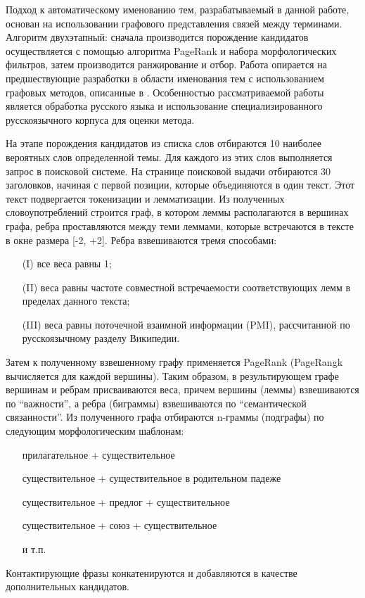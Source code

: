 Подход к автоматическому именованию тем, разрабатываемый в данной работе, основан на использовании графового представления связей между терминами. Алгоритм двухэтапный: сначала производится порождение кандидатов осуществляется с помощью алгоритма PageRank и набора морфологических фильтров, затем производится ранжирование и отбор. Работа опирается на предшествующие разработки в области именования тем с использованием графовых методов, описанные в \parencite{aletras2014labelling}. Особенностью рассматриваемой работы является обработка русского языка и использование специализированного русскоязычного корпуса для оценки метода.

На этапе порождения кандидатов из списка слов отбираются 10 наиболее вероятных слов определенной темы. Для каждого из этих слов выполняется запрос в поисковой системе. На странице поисковой выдачи отбираются 30 заголовков, начиная с первой позиции, которые объединяются в один текст. Этот текст подвергается токенизации и лемматизации. Из полученных словоупотреблений строится граф, в котором леммы располагаются в вершинах графа, ребра проставляются между теми леммами, которые встречаются в тексте в окне размера [-2, +2]. Ребра взвешиваются тремя способами: 
\begin{itemize}
    \item[(I)] все веса равны 1; 
    \item[(II)] веса равны частоте совместной встречаемости соответствующих лемм в пределах данного текста;
    \item[(III)] веса равны поточечной взаимной информации (PMI), рассчитанной по русскоязычному разделу Википедии.
\end{itemize} 
\noindent Затем к полученному взвешенному графу применяется PageRank (PageRangk вычисляется для каждой вершины). Таким образом, в результирующем графе вершинам и ребрам присваиваются веса, причем вершины (леммы) взвешиваются по ``важности'', а ребра (биграммы) взвешиваются по ``семантической связанности''. Из полученного графа отбираются n-граммы (подграфы) по следующим морфологическим шаблонам:
\begin{itemize}
    \item[] прилагательное + существительное
    \item[] существительное + существительное в родительном падеже
    \item[] существительное + предлог + существительное
    \item[] существительное + союз + существительное
    \item[] и т.п.
\end{itemize} 
Контактирующие фразы конкатенируются и добавляются в качестве дополнительных кандидатов.

